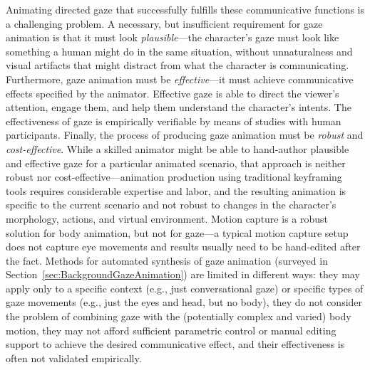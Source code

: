 Animating directed gaze that successfully fulfills these communicative functions is a challenging problem. A necessary, but insufficient requirement for gaze animation is that it must look \emph{plausible}---the character's gaze must look like something a human might do in the same situation, without unnaturalness and visual artifacts that might distract from what the character is communicating.
Furthermore, gaze animation must be \emph{effective}---it must achieve communicative effects specified by the animator. Effective gaze is able to direct the viewer's attention, engage them, and help them understand the character's intents. The effectiveness of gaze is empirically verifiable by means of studies with human participants. Finally, the process of producing gaze animation must be \emph{robust} and \emph{cost-effective}. While a skilled animator might be able to hand-author plausible and effective gaze for a particular animated scenario, that approach is neither robust nor cost-effective---animation production using traditional keyframing tools requires considerable expertise and labor, and the resulting animation is specific to the current scenario and not robust to changes in the character's morphology, actions, and virtual environment. Motion capture is a robust solution for body animation, but not for gaze---a typical motion capture setup does not capture eye movements and results usually need to be hand-edited after the fact. Methods for automated synthesis of gaze animation (surveyed in Section~\ref{sec:BackgroundGazeAnimation}) are limited in different ways: they may apply only to a specific context (e.g., just conversational gaze) or specific types of gaze movements (e.g., just the eyes and head, but no body), they do not consider the problem of combining gaze with the (potentially complex and varied) body motion, they may not afford sufficient parametric control or manual editing support to achieve the desired communicative effect, and their effectiveness is often not validated empirically.

